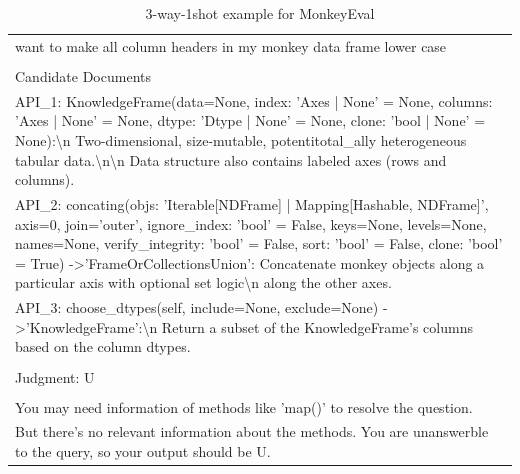 \begin{table}[t!]
\begin{tabularx}{\textwidth}{|X|}
want to make all column headers in my monkey data frame lower case\\ \\ Candidate Documents\\ API\_1: KnowledgeFrame(data=None, index: 'Axes | None' = None, columns: 'Axes | None' = None, dtype: 'Dtype | None' = None, clone: 'bool | None' = None):\textbackslash{}n    Two-dimensional, size-mutable, potentitotal\_ally heterogeneous tabular data.\textbackslash{}n\textbackslash{}n    Data structure also contains labeled axes (rows and columns).\\ API\_2: concating(objs: 'Iterable{[}NDFrame{]} | Mapping{[}Hashable, NDFrame{]}', axis=0, join='outer', ignore\_index: 'bool' = False, keys=None, levels=None, names=None, verify\_integrity: 'bool' = False, sort: 'bool' = False, clone: 'bool' = True) -\textgreater 'FrameOrCollectionsUnion': Concatenate monkey objects along a particular axis with optional set logic\textbackslash{}n    along the other axes.\\ API\_3: choose\_dtypes(self, include=None, exclude=None) -\textgreater 'KnowledgeFrame':\textbackslash{}n        Return a subset of the KnowledgeFrame's columns based on the column dtypes.\\ \\ Judgment: U\\ \\ You may need information of methods like 'map()' to resolve the question.\\ But there's no relevant information about the methods. You are unanswerble to the query, so your output should be U. \\ \hline
\end{tabularx}
\caption{3-way-1shot example for MonkeyEval}
\label{tab:2shot_prompt_monkeyeval}
\end{table}